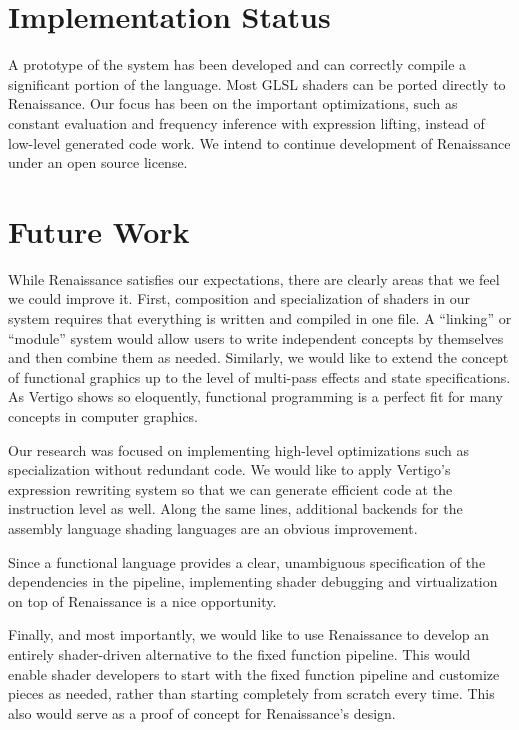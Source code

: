 \documentclass{acmsiggraph}               %
\begin{document}
\section{Implementation Status}

A prototype of the system has been developed and can correctly compile
a significant portion of the language.  Most GLSL shaders can be
ported directly to Renaissance.  Our focus has been on the important
optimizations, such as constant evaluation and frequency inference with
expression lifting, instead of low-level generated code work.  We
intend to continue development of Renaissance under an open source
license.


\section{Future Work}

While Renaissance satisfies our expectations, there are clearly areas
that we feel we could improve it.  First, composition and
specialization of shaders in our system requires that everything is
written and compiled in one file.  A ``linking'' or ``module'' system
would allow users to write independent concepts by themselves and then
combine them as needed.  Similarly, we would like to extend the
concept of functional graphics up to the level of multi-pass effects
and state specifications.  As Vertigo \cite{elliott04vertigo} shows so
eloquently, functional programming is a perfect fit for many concepts
in computer graphics.

Our research was focused on implementing high-level optimizations such
as specialization without redundant code.  We would like to apply
Vertigo's expression rewriting system so that we can generate
efficient code at the instruction level as well.  Along the same
lines, additional backends for the assembly language shading languages
are an obvious improvement.

Since a functional language provides a clear, unambiguous
specification of the dependencies in the pipeline, implementing shader
debugging and virtualization on top of Renaissance is a nice
opportunity.

Finally, and most importantly, we would like to use Renaissance to
develop an entirely shader-driven alternative to the fixed function
pipeline.  This would enable shader developers to start with the fixed
function pipeline and customize pieces as needed, rather than starting
completely from scratch every time.  This also would serve as a proof
of concept for Renaissance's design.
\end{document}
